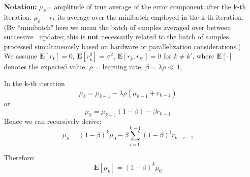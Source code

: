 \documentclass{article} %
\begin{document}
\textbf{Notation:} $\mu_k$= amplitude of true average of the error component after the k-th iteration. $\mu_k + r_k$ its average over the minibatch employed in the k-th iteration. (By ``minibatch" here we mean the batch of samples averaged over between successive \SGD~updates; this is \textbf{not} necessarily related to the batch of samples processed simultaneously based on hardware or parallelization considerations.) We assume $\mathbf{E}[r_k]=0$, $\mathbf{E}[r_k^2]=\sigma^2$, $\mathbf{E}[r_k,r_{k'}]=0$ for $k \neq k'$, where $\mathbf E[\cdot]$ denotes the expected value.
$\rho$ = learning rate, $\beta=\lambda \rho \ll 1$, 

In the k-th iteration 
\begin{equation}
\mu_k = \mu_{k-1} - \lambda \rho (\mu_{k-1} + r_{k-1})
\label{eqn:muupdate}
\end{equation}
or
\begin{equation}
	\mu_k = \mu_{k-1} (1- \beta)  - \beta r_{k-1}
	\label{eqn:muupdate2}
\end{equation}
Hence we can recursively derive:
\begin{equation}
  \mu_k = (1-\beta)^k \mu_0 - \beta \sum_{i=0}^{k-1} (1-\beta)^i r_{k-i-1}
\end{equation}

Therefore:
\begin{equation}
\mathbf E [\mu_k] = (1-\beta)^k \mu_0 
\end{equation}
\end{document}
